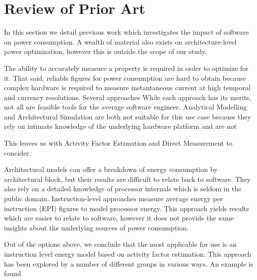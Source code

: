 \section{Review of Prior Art}
\label{sec:prior}

In this section we detail previous work which investigates the impact of software on power consumption. A wealth of material also exists on architecture-level power optimization, however this is outside the scope of our study.\golden

The ability to accurately measure a property is required in order to optimize for it. That said, reliable figures for power consumption are hard to obtain because complex hardware is required to measure instantaneous current at high temporal and currency resolutions. Several approaches  While each approach has its merits, not all are feasible tools for the average software engineer. Analytical Modelling and Architectural Simulation are both not suitable for this use case because they rely on intimate knowledge of the underlying hardware platform and are not 



This leaves us with Activity Factor Estimation and  Direct Measurement to concider.






Architectural models can offer a breakdown of energy consumption by architectural block, but their results are difficult to relate back to software. They also rely on a detailed knowledge of processor internals which is seldom in the public domain. Instruction-level approaches measure average energy per instruction (EPI) figures to model processor energy. This approach yields results which are easier to relate to software, however it does not provide the same insights about the underlying sources of power consumption.\golden


Out of the options above, we conclude that the most applicable for use is an instruction level energy model based on activity factor estimation. This approach has been explored by a number of different groups in various ways. An  example is found  







